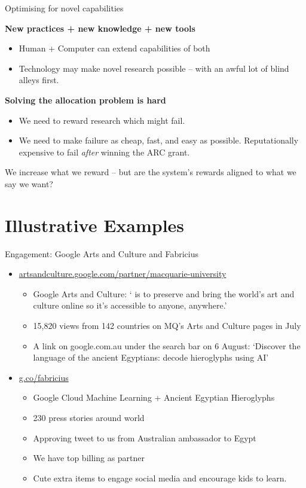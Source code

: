 \documentclass[aspectratio=1610, 11pt]{beamer} %
\begin{document}
\begin{frame}{Optimising for novel capabilities}

\textbf{New practices + new knowledge + new tools }
\begin{itemize}
    \item Human + Computer can extend capabilities of both
    \item Technology may make novel research possible -- with an awful lot of blind alleys first.
\end{itemize}

\textbf{Solving the allocation problem is hard}
\begin{itemize}
    \item We need to reward research which might fail.
    \item We need to make failure as cheap, fast, and easy as possible. Reputationally expensive to fail \textit{after} winning the ARC grant.
\end{itemize}

We increase what we reward -- but are the system's rewards aligned to what we say we want? \parencite{Beer2002-tl}
\end{frame}

\section{Illustrative Examples}

\begin{frame}{Engagement: Google Arts and Culture and Fabricius}

\begin{itemize}
    \item \url{artsandculture.google.com/partner/macquarie-university}
    \begin{itemize}
    \item Google Arts and Culture: ` is to preserve and bring the world’s art and culture online so it’s accessible to anyone, anywhere.' \parencite{Google_Arts_and_Culture2020-ga}
    \item 15,820 views from 142 countries on MQ's Arts and Culture pages in July
    \item A link on google.com.au under the search bar on 6 August: `Discover the language of the ancient Egyptians: decode hieroglyphs using AI'
    \end{itemize}
    \item \url{g.co/fabricius}
    \begin{itemize}
    \item Google Cloud Machine Learning + Ancient Egyptian Hieroglyphs
    \item 230 press stories around world
    \item Approving tweet to us from Australian ambassador to Egypt
    \item We have top billing as partner
    \item Cute extra items to engage social media and encourage kids to learn.
    \end{itemize}
\end{itemize}

\end{frame}
\end{document}
